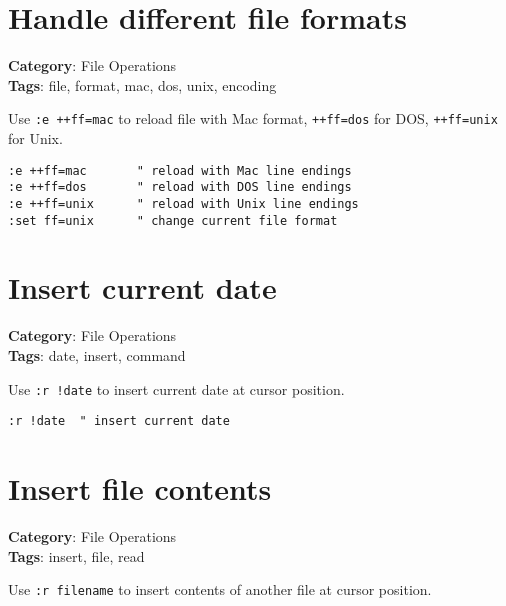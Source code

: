 {{{{{\section{Handle different file formats}

\textbf{Category}: File Operations\\ \textbf{Tags}: file, format, mac, dos, unix, encoding
\vspace{0.5cm}

Use {\footnotesize \Verb§:e ++ff=mac§} to reload file with Mac format, {\footnotesize \Verb§++ff=dos§} for DOS, {\footnotesize \Verb§++ff=unix§} for Unix.

\begin{Exa*}{}
\begin{Verbatim}[fontsize=\footnotesize, breaklines, breakanywhere]
:e ++ff=mac       " reload with Mac line endings
:e ++ff=dos       " reload with DOS line endings
:e ++ff=unix      " reload with Unix line endings
:set ff=unix      " change current file format
\end{Verbatim}
\end{Exa*}

\section{Insert current date}

\textbf{Category}: File Operations\\ \textbf{Tags}: date, insert, command
\vspace{0.5cm}

Use {\footnotesize \Verb§:r !date§} to insert current date at cursor position.

\begin{Exa*}{}
\begin{Verbatim}[fontsize=\footnotesize, breaklines, breakanywhere]
:r !date  " insert current date
\end{Verbatim}
\end{Exa*}

\section{Insert file contents}

\textbf{Category}: File Operations\\ \textbf{Tags}: insert, file, read
\vspace{0.5cm}

Use {\footnotesize \Verb§:r filename§} to insert contents of another file at cursor position.

}}}}}
